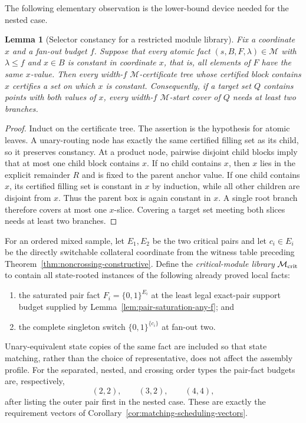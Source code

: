 \documentclass[11pt]{article}
\newtheorem{lemma}[definition]{Lemma}
\begin{document}
The following elementary observation is the lower-bound device needed for the
nested case.

\begin{lemma}[Selector constancy for a restricted module library]
\label{lem:selector-constancy}
Fix a coordinate $x$ and a fan-out budget $f$.  Suppose that every atomic fact
$(s,B,F,\lambda)\in\mathcal M$ with $\lambda\le f$ and $x\in B$ is constant in
coordinate $x$, that is, all elements of $F$ have the same $x$-value.  Then
every width-$f$ $\mathcal M$-certificate tree whose certified block contains
$x$ certifies a set on which $x$ is constant.  Consequently, if a target set
$Q$ contains points with both values of $x$, every width-$f$
$\mathcal M$-start cover of $Q$ needs at least two branches.
\end{lemma}

\begin{proof}
Induct on the certificate tree.  The assertion is the hypothesis for atomic
leaves.  A unary-routing node has exactly the same certified filling set as
its child, so it preserves constancy.  At a product node, pairwise disjoint
child blocks imply that at most one child block contains $x$.  If no child
contains $x$, then $x$ lies in the explicit remainder $R$ and is fixed to the
parent anchor value.  If one child contains $x$, its certified filling set is
constant in $x$ by induction, while all other children are disjoint from $x$.
Thus the parent box is again constant in $x$.  A single root branch therefore
covers at most one $x$-slice.  Covering a target set meeting both slices needs
at least two branches.
\end{proof}

For an ordered mixed sample, let $E_1,E_2$ be the two critical pairs and let
$c_i\in E_i$ be the directly switchable collateral coordinate from the witness
table preceding Theorem~\ref{thm:noncrossing-constructive}.  Define the
\emph{critical-module library} $\mathcal M_{\rm crit}$ to contain all
state-rooted instances of the following already proved local facts:
\begin{enumerate}[label=\textup{(M\arabic*)},leftmargin=*]
\item the saturated pair fact
$F_i=\{0,1\}^{E_i}$ at the least legal exact-pair support budget supplied by
Lemma~\ref{lem:pair-saturation-any-f}; and
\item the complete singleton switch
$\{0,1\}^{\{c_i\}}$ at fan-out two.
\end{enumerate}
Unary-equivalent state copies of the same fact are included so that state
matching, rather than the choice of representative, does not affect the
assembly profile.  For the separated, nested, and crossing order types the
pair-fact budgets are, respectively,
\[
 (2,2),\qquad(3,2),\qquad(4,4),
\]
after listing the outer pair first in the nested case.  These are exactly the
requirement vectors of Corollary~\ref{cor:matching-scheduling-vectors}.
\end{document}
